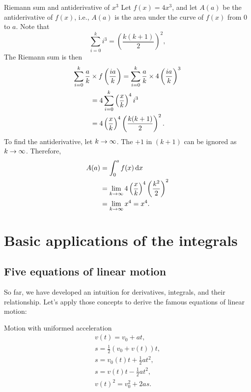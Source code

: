 \begin{exmp}{Riemann sum and antiderivative of \(x^3\)}{}
  Let \(f(x) = 4x^3\), and let \(A(a)\) be the antiderivative of \(f(x)\), i.e., \(A(a)\) is the area under the curve of \(f(x)\) from \(0\) to \(a\). Note that
  \begin{equation}
    \sum_{i = 0}^{k}i^3 = \left(\frac{k(k + 1)}{2}\right)^2,
  \end{equation}
  The Riemann sum is then
  \begin{align*}
    \sum_{i = 0}^{k}\frac{a}{k} & \times f\left( i a \over k \right) = \sum_{i = 0}^k\frac{a}{k}\times 4\left(ia\over k\right)^3 \\
                                & = 4\sum_{i = 0}^k \left(\frac{x}{k}\right)^4 i^3                                               \\
                                & = 4\left(\frac{x}{k}\right)^4\left(k(k+1)\over 2\right)^2.
  \end{align*}
  To find the antiderivative, let \(k \rightarrow \infty\). The \(+1\) in \((k + 1)\) can be ignored as \(k \rightarrow \infty\). Therefore,
  \begin{align*}
    A(a) & = \int_0^a f(x)\odif{x}                                                \\
         & = \lim_{k\appr\infty}4\left(x\over k\right)^4\left(k^2\over 2\right)^2 \\
         & = \lim_{k\appr\infty}x^4 = x^4.
  \end{align*}
\end{exmp}

\section{Basic applications of the integrals}

\subsection{Five equations of linear motion}
\label{sec:fiveequationsoflinearmotion}

So far, we have developed an intuition for derivatives, integrals, and their relationship. Let's apply those concepts to derive the famous equations of linear motion:
\begin{theorem}{Motion with uniformed acceleration}{}
  \begin{gather}
    v(t) = v_0 + at, \label{eq:linearmotion1}\\
    s = \frac{1}{2}(v_0 + v(t))t, \label{eq:linearmotion2}\\
    s = v_0(t)t + \frac{1}{2}at^2, \label{eq:linearmotion3}\\
    s = v(t)t - \frac{1}{2}at^2,\label{eq:linearmotion4}\\
    v(t)^2 = v_0^2 + 2as. \label{eq:linearmotion5}
  \end{gather}
\end{theorem}

